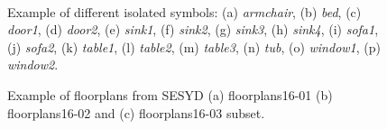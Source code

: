 \begin{figure}[!h]
\begin{center}
\hspace{0.5mm}
\hspace{0.5mm}
\hspace{0.5mm}
\hspace{0.5mm}
\hspace{0.5mm}
\hspace{0.5mm}
\hspace{0.5mm}
\\
\hspace{0.5mm}
\hspace{0.5mm}
\hspace{0.5mm}
\hspace{0.5mm}
\hspace{0.5mm}
\hspace{0.5mm}
\hspace{0.5mm}
\hspace{0.5mm}
\end{center}
\caption{Example of different isolated symbols: (a) \emph{armchair}, (b) \emph{bed}, (c) \emph{door1}, (d) \emph{door2}, (e) \emph{sink1}, (f) \emph{sink2}, (g) \emph{sink3}, (h) \emph{sink4}, (i) \emph{sofa1}, (j) \emph{sofa2}, (k) \emph{table1}, (l) \emph{table2}, (m) \emph{table3}, (n) \emph{tub}, (o) \emph{window1}, (p) \emph{window2}.}
\label{fig:datasets:symbs-sesyds}
\end{figure}

\begin{figure}[h!]
\begin{center}
\subfloat{\texttt{[image: 01\_00]}}
\hspace{0.5mm}
\subfloat{\texttt{[image: 02\_00]}}
\hspace{0.5mm}
\subfloat{\texttt{[image: 03\_00]}}
\end{center}
\caption{Example of floorplans from SESYD (a) floorplans16-01 (b) floorplans16-02 and (c) floorplans16-03 subset.}
\label{fig:datasets:fps16-01}
\end{figure}

